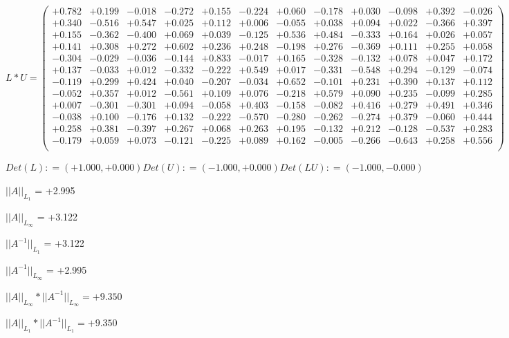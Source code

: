 \documentclass[9pt]{article}
\theoremstyle{plain}
\theoremstyle{definition}
\theoremstyle{remark}
\numberwithin{equation}{section}
\begin{document}
$L * U  = \left(
\begin{array}{
cccccccccccc}
+0.782 & +0.199 & -0.018 & -0.272 & +0.155 & -0.224 & +0.060 & -0.178 & +0.030 & -0.098 & +0.392 & -0.026 \\
+0.340 & -0.516 & +0.547 & +0.025 & +0.112 & +0.006 & -0.055 & +0.038 & +0.094 & +0.022 & -0.366 & +0.397 \\
+0.155 & -0.362 & -0.400 & +0.069 & +0.039 & -0.125 & +0.536 & +0.484 & -0.333 & +0.164 & +0.026 & +0.057 \\
+0.141 & +0.308 & +0.272 & +0.602 & +0.236 & +0.248 & -0.198 & +0.276 & -0.369 & +0.111 & +0.255 & +0.058 \\
-0.304 & -0.029 & -0.036 & -0.144 & +0.833 & -0.017 & +0.165 & -0.328 & -0.132 & +0.078 & +0.047 & +0.172 \\
+0.137 & -0.033 & +0.012 & -0.332 & -0.222 & +0.549 & +0.017 & -0.331 & -0.548 & +0.294 & -0.129 & -0.074 \\
-0.119 & +0.299 & +0.424 & +0.040 & -0.207 & -0.034 & +0.652 & -0.101 & +0.231 & +0.390 & +0.137 & +0.112 \\
-0.052 & +0.357 & +0.012 & -0.561 & +0.109 & +0.076 & -0.218 & +0.579 & +0.090 & +0.235 & -0.099 & +0.285 \\
+0.007 & -0.301 & -0.301 & +0.094 & -0.058 & +0.403 & -0.158 & -0.082 & +0.416 & +0.279 & +0.491 & +0.346 \\
-0.038 & +0.100 & -0.176 & +0.132 & -0.222 & -0.570 & -0.280 & -0.262 & -0.274 & +0.379 & -0.060 & +0.444 \\
+0.258 & +0.381 & -0.397 & +0.267 & +0.068 & +0.263 & +0.195 & -0.132 & +0.212 & -0.128 & -0.537 & +0.283 \\
-0.179 & +0.059 & +0.073 & -0.121 & -0.225 & +0.089 & +0.162 & -0.005 & -0.266 & -0.643 & +0.258 & +0.556 \\
\end{array}
\right)$ \newline 

$Det(L) :    = (+1.000,+0.000)     Det(U) :    = (-1.000,+0.000)     Det(LU) :    = (-1.000,-0.000)$

$||A||_{L_1}$  = +2.995

$||A||_{L_{\infty}}$ = +3.122

$||A^{-1}||_{L_1}$  = +3.122

$||A^{-1}||_{L_{\infty}}$ = +2.995

$||A||_{L_{\infty}} * ||A^{-1}||_{L_{\infty}} = +9.350$

$||A||_{L_1} * ||A^{-1}||_{L_1} = +9.350$
\end{document}
